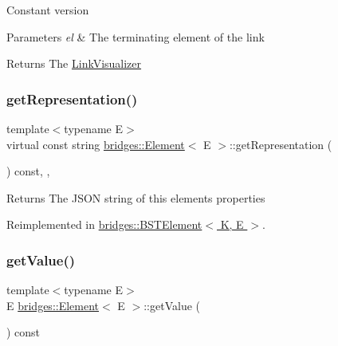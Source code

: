 Constant version


\begin{DoxyParams}{Parameters}
{\em el} & The terminating element of the link \\
\hline
\end{DoxyParams}
\begin{DoxyReturn}{Returns}
The \hyperlink{classbridges_1_1_link_visualizer}{Link\+Visualizer} 
\end{DoxyReturn}
\hypertarget{classbridges_1_1_element_aab9638d19b612b69db1b96d0dbf39482}{}\label{classbridges_1_1_element_aab9638d19b612b69db1b96d0dbf39482} 
\subsubsection{\texorpdfstring{get\+Representation()}{getRepresentation()}}
{\footnotesize\ttfamily template$<$typename E$>$ \\
virtual const string \hyperlink{classbridges_1_1_element}{bridges\+::\+Element}$<$ E $>$\+::get\+Representation (\begin{DoxyParamCaption}{ }\end{DoxyParamCaption}) const\hspace{0.3cm}{\ttfamily [inline]}, {\ttfamily [protected]}, {\ttfamily [virtual]}}

\begin{DoxyReturn}{Returns}
The J\+S\+ON string of this element\textquotesingle{}s properties 
\end{DoxyReturn}


Reimplemented in \hyperlink{classbridges_1_1_b_s_t_element_a7c177dc3d3ff942d6d534e1dfcbfee00}{bridges\+::\+B\+S\+T\+Element$<$ K, E $>$}.

\hypertarget{classbridges_1_1_element_a7df53b8b248020e9536bb951c725c7ba}{}\label{classbridges_1_1_element_a7df53b8b248020e9536bb951c725c7ba} 
\subsubsection{\texorpdfstring{get\+Value()}{getValue()}}
{\footnotesize\ttfamily template$<$typename E$>$ \\
E \hyperlink{classbridges_1_1_element}{bridges\+::\+Element}$<$ E $>$\+::get\+Value (\begin{DoxyParamCaption}{ }\end{DoxyParamCaption}) const\hspace{0.3cm}{\ttfamily [inline]}}

